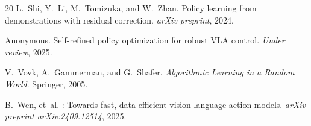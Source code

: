 \documentclass[letterpaper]{article}
\begin{document}
\begin{thebibliography}{20}
L.~Shi, Y.~Li, M.~Tomizuka, and W.~Zhan.
\newblock Policy learning from demonstrations with residual correction.
\newblock \emph{arXiv preprint}, 2024.

Anonymous.
\newblock Self-refined policy optimization for robust {VLA} control.
\newblock \emph{Under review}, 2025.

V.~Vovk, A.~Gammerman, and G.~Shafer.
\newblock \emph{Algorithmic Learning in a Random World}.
\newblock Springer, 2005.

B.~Wen, et~al.
: Towards fast, data-efficient vision-language-action models.
\newblock \emph{arXiv preprint arXiv:2409.12514}, 2025.

\end{thebibliography}
\end{document}

